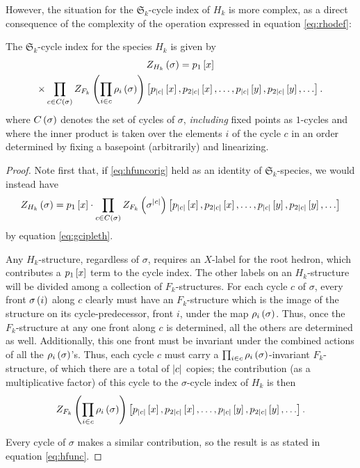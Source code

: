 \documentclass[sectionflow,singlespace,twoside,boldmathhdr]{brandiss} %
\numberwithin{section}{chapter}
\numberwithin{figure}{chapter}
\begin{document}
However, the situation for the $\mathfrak{S}_{k}$-cycle index of $H_{k}$ is more complex, as a direct consequence of the complexity of the operation expressed in equation \eqref{eq:rhodef}:
\begin{theorem}
  \label{thm:hfunc}
  The $\mathfrak{S}_{k}$-cycle index for the species $H_{k}$ is given by
  \begin{multline}
    \label{eq:hfunc}
    Z_{H_{k}} \left( {\sigma} \right) = p_{1} \left[ {x} \right] \\
    \times \prod_{c \in C \left( {\sigma} \right)} Z_{F_{k}} \left( {\prod_{i \in c} \rho_{i} \left( {\sigma} \right)} \right) \left[ {p_{\left\vert {c} \right\vert} \left[ {x} \right], p_{2 \left\vert {c} \right\vert} \left[ {x} \right], \dots, p_{\left\vert {c} \right\vert} \left[ {y} \right], p_{2 \left\vert {c} \right\vert} \left[ {y} \right], \dots} \right].
  \end{multline}
  where $C \left( {\sigma} \right)$ denotes the set of cycles of $\sigma$, \emph{including} fixed points as $1$-cycles and where the inner product is taken over the elements $i$ of the cycle $c$ in an order determined by fixing a basepoint (arbitrarily) and linearizing.
\end{theorem}

\begin{proof}
  Note first that, if \eqref{eq:hfuncorig} held as an identity of $\mathfrak{S}_{k}$-species, we would instead have
  \begin{equation*}
    Z_{H_{k}} \left( {\sigma} \right) = p_{1} \left[ {x} \right] \cdot \prod_{c \in C \left( {\sigma} \right)} Z_{F_{k}} \left( {\sigma^{\left\vert {c} \right\vert}} \right) \left[ {p_{\left\vert {c} \right\vert} \left[ {x} \right], p_{2 \left\vert {c} \right\vert} \left[ {x} \right], \dots, p_{\left\vert {c} \right\vert} \left[ {y} \right], p_{2 \left\vert {c} \right\vert} \left[ {y} \right], \dots} \right]
  \end{equation*}
  by equation \eqref{eq:gcipleth}.

  Any $H_{k}$-structure, regardless of $\sigma$, requires an $X$-label for the root hedron, which contributes a $p_{1} \left[ {x} \right]$ term to the cycle index.
  The other labels on an $H_{k}$-structure will be divided among a collection of $F_{k}$-structures.
  For each cycle $c$ of $\sigma$, every front $\sigma \left( {i} \right)$ along $c$ clearly must have an $F_{k}$-structure which is the image of the structure on its cycle-predecessor, front $i$, under the map $\rho_{i} \left( {\sigma} \right)$.
  Thus, once the $F_{k}$-structure at any one front along $c$ is determined, all the others are determined as well.
  Additionally, this one front must be invariant under the combined actions of all the $\rho_{i} \left( {\sigma} \right)$'s.
  Thus, each cycle $c$ must carry a $\prod_{i \in c} \rho_{i} \left( {\sigma} \right)$-invariant $F_{k}$-structure, of which there are a total of $\left\vert {c} \right\vert$ copies; the contribution (as a multiplicative factor) of this cycle to the $\sigma$-cycle index of $H_{k}$ is then
  \begin{equation*}
    Z_{F_{k}} \left( {\prod_{i \in c} \rho_{i} \left( {\sigma} \right)} \right) \left[ {p_{\left\vert {c} \right\vert} \left[ {x} \right], p_{2 \left\vert {c} \right\vert} \left[ {x} \right], \dots, p_{\left\vert {c} \right\vert} \left[ {y} \right], p_{2 \left\vert {c} \right\vert} \left[ {y} \right], \dots} \right].
  \end{equation*}

  Every cycle of $\sigma$ makes a similar contribution, so the result is as stated in equation \eqref{eq:hfunc}.
\end{proof}
\end{document}
